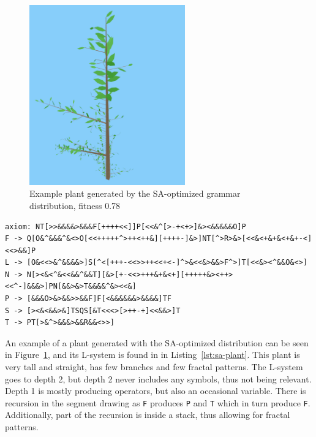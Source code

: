 \begin{figure}
    \centering
    \includegraphics[width=0.6\textwidth]{figures/sa-plant}
    \caption[Example plant generated by the SA-optimized grammar distribution]{Example plant generated by the SA-optimized grammar distribution, fitness 0.78}
    \label{fig:sa-plant}
\end{figure}

\begin{lstlisting}[caption=L-system representation of plant in Figure~\ref{fig:sa-plant}, label=lst:sa-plant, float]
axiom: NT[>>&&&&>&&&F[++++<<]]P[<<&^[>-+<+>]&><&&&&&O]P
F -> Q[O&^&&&^&<>O[<<+++++^>++<++&][++++-]&>]NT[^>R>&>[<<&<+&+&<+&+-<]<<>&&]P
L -> [O&<<>&^&&&&>]S[^<[+++-<<>>++<<+<-]^>&<<&>&&>F^>]T[<<&><^&&O&<>]
N -> N[><&<^&<<&&^&&T][&>[+-<<>+++&+&<+][+++++&><++><<^-]&&&>]PN[&&>&>T&&&&^&><<&]
P -> [&&&O>&>&&>>&&F]F[<&&&&&&>&&&&]TF
S -> [><&<&&>&]TSQS[&T<<<>[>++-+]<<&&>]T
T -> PT[>&^>&&&>&&R&&<>>]
\end{lstlisting}

An example of a plant generated with the SA-optimized distribution can be seen in Figure~\ref{fig:sa-plant}, and its L-system is found in in Listing~\ref{lst:sa-plant}.
This plant is very tall and straight, has few branches and few fractal patterns.
The L-system goes to depth 2, but depth 2 never includes any symbols, thus not being relevant.
Depth 1 is mostly producing operators, but also an occasional variable.
There is recursion in the segment drawing as \texttt{F} produces \texttt{P} and \texttt{T} which in turn produce \texttt{F}.
Additionally, part of the recursion is inside a stack, thus allowing for fractal patterns.

